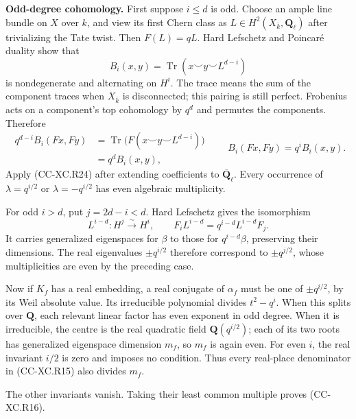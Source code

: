 \textbf{Odd-degree cohomology.} First suppose \(i\le d\) is odd. Choose
an ample line bundle on \(X\) over \(k\), and view its first Chern class
as \(L\in H^2(X_{\bar k},\mathbf Q_\ell)\) after trivializing the Tate
twist. Then \(F(L)=qL\). Hard Lefschetz and Poincaré duality show that
\[
 B_i(x,y)=\operatorname{Tr}(x\smile y\smile L^{d-i})
                                                        \tag{CC-XC.R25}
\] is nondegenerate and alternating on \(H^i\). The trace means the sum
of the component traces when \(X_{\bar k}\) is disconnected; this
pairing is still perfect. Frobenius acts on a component's top cohomology
by \(q^d\) and permutes the components. Therefore \[
 \begin{aligned}
 q^{d-i}B_i(Fx,Fy)
 &=\operatorname{Tr}
       \bigl(F(x\smile y\smile L^{d-i})\bigr)\\
 &=q^d B_i(x,y),
 \end{aligned}
 \qquad B_i(Fx,Fy)=q^iB_i(x,y).                         \tag{CC-XC.R26}
\] Apply (CC-XC.R24) after extending coefficients to
\(\overline{\mathbf Q}_\ell\). Every occurrence of \(\lambda=q^{i/2}\)
or \(\lambda=-q^{i/2}\) has even algebraic multiplicity.

For odd \(i>d\), put \(j=2d-i<d\). Hard Lefschetz gives the isomorphism
\[
 L^{i-d}:H^j\xrightarrow{\sim}H^i,\qquad
 F_i L^{i-d}=q^{i-d}L^{i-d}F_j.                         \tag{CC-XC.R27}
\] It carries generalized eigenspaces for \(\beta\) to those for
\(q^{i-d}\beta\), preserving their dimensions. The real eigenvalues
\(\pm q^{i/2}\) therefore correspond to \(\pm q^{j/2}\), whose
multiplicities are even by the preceding case.

Now if \(K_f\) has a real embedding, a real conjugate of \(\alpha_f\)
must be one of \(\pm q^{i/2}\), by its Weil absolute value. Its
irreducible polynomial divides \(t^2-q^i\). When this splits over
\(\mathbf Q\), each relevant linear factor has even exponent in odd
degree. When it is irreducible, the centre is the real quadratic field
\(\mathbf Q(q^{i/2})\); each of its two roots has generalized eigenspace
dimension \(m_f\), so \(m_f\) is again even. For even \(i\), the real
invariant \(i/2\) is zero and imposes no condition. Thus every
real-place denominator in (CC-XC.R15) also divides \(m_f\).

The other invariants vanish. Taking their least common multiple proves
(CC-XC.R16).

